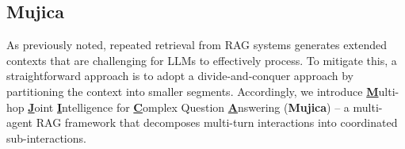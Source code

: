 \subsection{Mujica}
As previously noted, repeated retrieval from RAG systems generates extended contexts that are challenging for LLMs to effectively process.
To mitigate this, a straightforward approach is to adopt a divide-and-conquer approach by partitioning the context into smaller segments.
Accordingly, we introduce \underline{\textbf{M}}ulti-hop \underline{\textbf{J}}oint \underline{\textbf{I}}ntelligence for \underline{\textbf{C}}omplex Question \underline{\textbf{A}}nswering (\textbf{Mujica}) -- a multi-agent RAG framework that decomposes multi-turn interactions into coordinated sub-interactions.

